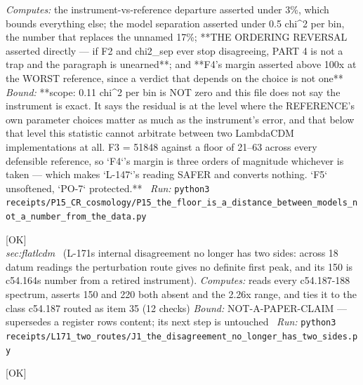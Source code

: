 \begin{description}
\emph{Computes:} the instrument-vs-reference departure asserted under 3\%, which bounds everything else; the model separation asserted under 0.5 chi\textasciicircum{}2 per bin, the number that replaces the unnamed 17\%; **THE ORDERING REVERSAL asserted directly --- if F2 and chi2\_sep ever stop disagreeing, PART 4 is not a trap and the paragraph is unearned**; and **F4's margin asserted above 100x at the WORST reference, since a verdict that depends on the choice is not one**
 \emph{Bound:} **scope: 0.11 chi\textasciicircum{}2 per bin is NOT zero and this file does not say the instrument is exact. It says the residual is at the level where the REFERENCE's own parameter choices matter as much as the instrument's error, and that below that level this statistic cannot arbitrate between two LambdaCDM implementations at all. F3 = 51848 against a floor of 21--63 across every defensible reference, so `F4`'s margin is three orders of magnitude whichever is taken --- which makes `L-147`'s reading SAFER and converts nothing. `F5` unsoftened, `PO-7` protected.**
\ \emph{Run:} \texttt{python3 receipts/P15\_CR\_cosmology/P15\_the\_floor\_is\_a\_distance\_between\_models\_not\_a\_number\_from\_the\_data.py}
\item[\label{rcpt:J1_the_disagreement_no_longer_has_two_sides}\textbf{}\quad\texttt{J1\_the\_disagreement\_no\_longer\_has\_two\_sides}]\hfill\textsf{[OK]}\\
\textit{sec:flatlcdm} \ (L-171s internal disagreement no longer has two sides: across 18 datum readings the perturbation route gives no definite first peak, and its 150 is c54.164s number from a retired instrument). 
\emph{Computes:} reads every c54.187-188 spectrum, asserts 150 and 220 both absent and the 2.26x range, and ties it to the class c54.187 routed as item 35 (12 checks)
 \emph{Bound:} NOT-A-PAPER-CLAIM --- supersedes a register rows content; its next step is untouched
\ \emph{Run:} \texttt{python3 receipts/L171\_two\_routes/J1\_the\_disagreement\_no\_longer\_has\_two\_sides.py}
\item[\rcptlabel{P15_the_spacing_deficit_survives_the_one_fitted_parameter}{P15R94}\textbf{P15R94}\quad\texttt{P15\_the\_spacing\_deficit\_survives\_the\_one\_fitted\_parameter}]\hfill\textsf{[OK]}\\

\end{description}
